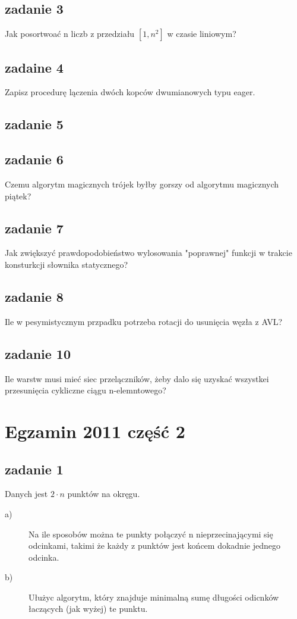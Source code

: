 \documentclass[svgnames]{report}
\begin{document}
\section{zadanie 3} 
Jak posortwoać n liczb z przedziału $[1, n^2]$ w  czasie liniowym?

\section{zadaine 4}
Zapisz procedurę lączenia dwóch kopców dwumianowych typu eager.

\section{zadanie 5}


\section{zadanie 6}
Czemu algorytm magicznych trójek byłby gorszy od algorytmu magicznych piątek?

\section{zadanie 7}
Jak zwiększyć prawdopodobieństwo wylosowania "poprawnej" funkcji w trakcie konsturkcji słownika statycznego?

\section{zadanie 8}
Ile w pesymistycznym przpadku potrzeba rotacji do usunięcia węzła z AVL?

\section{zadanie 10}
Ile warstw musi mieć siec przelączników, żeby dalo się uzyskać wszystkei przesunięcia cykliczne ciągu n-elemntowego?

\chapter{Egzamin 2011 część 2}

\section{zadanie 1}
Danych jest $2 \cdot n$ punktów na okręgu.
\begin{description}
	\item[a)] Na ile sposobów można te punkty połączyć n nieprzecinającymi się odcinkami, takimi że każdy z punktów jest końcem dokadnie jednego odcinka.
	\item[b)] Ułużyc algorytm, który znajduje minimalną sumę długości odicnków łaczących (jak wyżej) te punktu.
\end{description}
\end{document}
